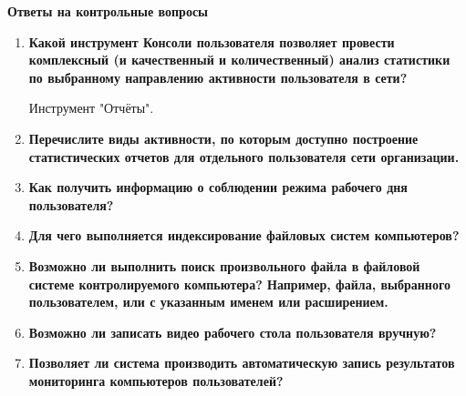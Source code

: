 \documentclass[a4paper,14pt]{extarticle}
\begin{document}
    \textbf{Ответы на контрольные вопросы}
    \begin{enumerate}
        \item \textbf{ Какой инструмент Консоли пользователя позволяет провести комплексный
    (и качественный и количественный) анализ статистики по выбранному направлению
    активности пользователя в сети? }

    \qquad Инструмент "Отчёты".

        \item \textbf{ Перечислите виды активности, по которым доступно построение
    статистических отчетов для отдельного пользователя сети организации. }
        \item \textbf{ Как получить информацию о соблюдении режима рабочего дня
    пользователя? }
        \item \textbf{ Для чего выполняется индексирование файловых систем компьютеров? }
        \item \textbf{ Возможно ли выполнить поиск произвольного файла в файловой системе
    контролируемого компьютера? Например, файла, выбранного пользователем, или с
    указанным именем или расширением. }
        \item \textbf{ Возможно ли записать видео рабочего стола пользователя вручную? }
        \item \textbf{ Позволяет ли система производить автоматическую запись результатов
    мониторинга компьютеров пользователей? }
    \end{enumerate}
    
\end{document}

